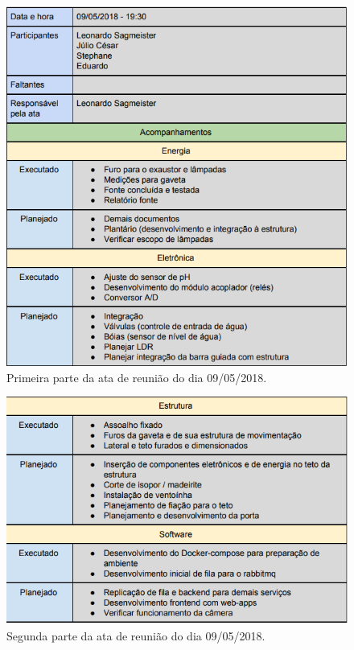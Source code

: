 \begin{apendicesenv}
\begin{figure}[H]
	\centering
	\includegraphics[width=15cm]{figuras/apendice_i_1.png}
	\caption{Primeira parte da ata de reunião do dia 09/05/2018.
	} \label{apendice_i_1}
\end{figure}

\begin{figure}[H]
	\centering
	\includegraphics[width=15cm]{figuras/apendice_i_2.png}
	\caption{Segunda parte da ata de reunião do dia 09/05/2018.
	} \label{apendice_i_2}
\end{figure}

\end{apendicesenv}